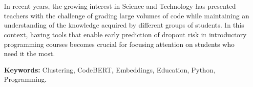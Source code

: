 \chapter*{\runtitle}

\noindent In recent years, the growing interest in Science and Technology has presented teachers with the challenge of grading large volumes of code while maintaining an understanding of the knowledge acquired by different groups of students. In this context, having tools that enable early prediction of dropout risk in introductory programming courses becomes crucial for focusing attention on students who need it the most.

\bigskip

\noindent\textbf{Keywords:} Clustering, CodeBERT, Embeddings, Education, Python, Programming.